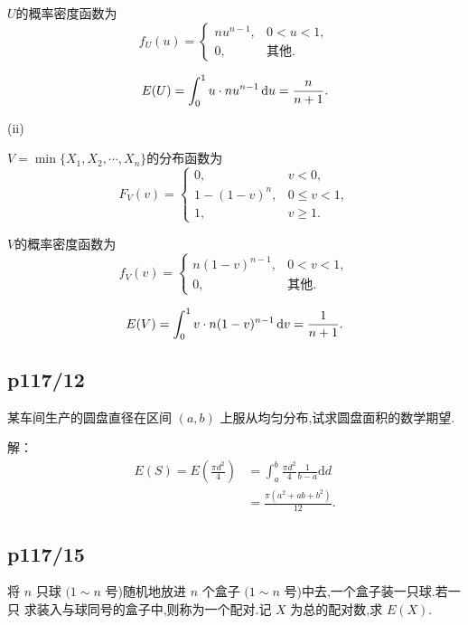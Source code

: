 \documentclass[UTF8,a4paper,10pt]{ctexart}
\begin{document}
$U$的概率密度函数为
\begin{equation}
    f_U(u)= \left\{
    \begin{array}{lr}
        nu^{n-1}, & 0<u<1, \\
        0, & \text{其他}.
    \end{array}
    \right.
\end{equation}

\begin{equation}
    E(U) = \int_0^1 u \cdot nu^{n-1}\,\text{d}u = {n\over n+1}.
\end{equation}

(ii)


$V=\min\{X_1,X_2,\cdots,X_n\}$的分布函数为
\begin{equation}
    F_V(v)= \left\{
    \begin{array}{lr}
    0,& v<0, \\
    1-(1-v)^n, & 0\leq v<1, \\
    1, & v\geq1 . 
    \end{array}
    \right.
\end{equation}

$V$的概率密度函数为
\begin{equation}
    f_V(v)= \left\{
    \begin{array}{lr}
        n(1-v)^{n-1}, & 0<v<1, \\
        0, & \text{其他}.
    \end{array}
    \right.
\end{equation}

\begin{equation}
    E(V) = \int_0^1 v \cdot n(1-v)^{n-1}\,\text{d}v = {1\over n+1}.
\end{equation}
\subsection{p117/12}
某车间生产的圆盘直径在区间 $(a, b)$ 上服从均匀分布,试求圆盘面积的数学期望.

解：
\begin{align}
    E(S) = E\left(\frac{\pi d^2}{4}\right) &= \int_a^b \frac{\pi d^2}{4}\frac{1}{b - a} \text{d} d \nonumber \\
                                           &= \frac{\pi(a^2 + ab + b^2)}{12}.
\end{align}

\subsection{p117/15}
将 $n$ 只球 $(1 \sim n$ 号)随机地放进 $n$ 个盒子 $(1 \sim n$ 号)中去,一个盒子装一只球.若一只 求装入与球同号的盒子中,则称为一个配对.记 $X$ 为总的配对数,求 $E(X)$.
\end{document}
